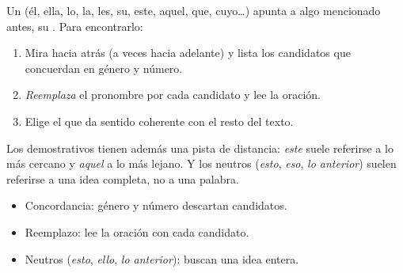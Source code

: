 

Un  (él, ella, lo, la, les, su, este, aquel, que, cuyo…) apunta a algo mencionado antes, su
. Para encontrarlo:
\begin{enumerate}
  \item Mira hacia atrás (a veces hacia adelante) y lista los candidatos que concuerdan en género y número.
  \item \emph{Reemplaza} el pronombre por cada candidato y lee la oración.
  \item Elige el que da sentido coherente con el resto del texto.
\end{enumerate}

Los demostrativos tienen además una pista de distancia: \emph{este} suele referirse a lo más cercano y \emph{aquel} a lo más
lejano. Y los neutros (\emph{esto}, \emph{eso}, \emph{lo anterior}) suelen referirse a una idea completa, no a una palabra.


\begin{regla}
\begin{itemize}
  \item Concordancia: género y número descartan candidatos.
  \item Reemplazo: lee la oración con cada candidato.
  \item Neutros (\emph{esto}, \emph{ello}, \emph{lo anterior}): buscan una idea entera.
\end{itemize}
\end{regla}

